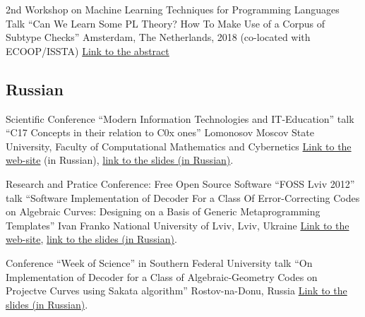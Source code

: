 \documentclass[11pt,a4paper]{moderncv}   %
\newcommand{\CPP}
{C\nolinebreak[4]\hspace{-.05em}\raisebox{.35ex}{\scriptsize\bfseries +\hspace{-.05em}+}}
\newcommand{\myhref}[2]{\textcolor{blue}{\href{#1}{#2}}}
\begin{document}
%
    {2nd Workshop on Machine Learning Techniques for Programming Languages}%
    {Talk ``Can We Learn Some PL Theory? How To Make Use of a Corpus of Subtype Checks''}
    {Amsterdam, The Netherlands, 2018 (co-located with ECOOP/ISSTA)}{}%
    {\myhref{%
https://conf.researchr.org/event/ecoop-issta-2018/ml4pl-2018-papers-can-we-learn-some-pl-theory-how-to-make-use-of-a-corpus-of-subtype-checks}{Link to the abstract}}

{\footnotesize
\subsection{Russian}

%
    {Scientific Conference “Modern Information Technologies and IT-Education”}%
    {talk “\protect\CPP{}17 Concepts in their relation to \protect\CPP{}0x ones”}
    {Lomonosov Moscov State University, Faculty of Computational Mathematics and Cybernetics}{}%
    {\myhref{http://conf.it-edu.ru/conference/2015/programm}{Link to the web-site} (in Russian),
\myhref{http://staff.mmcs.sfedu.ru/~ulysses/Papers/Talks/2015-SITITO-Cpp1z-concepts.pdf}{link to the slides (in Russian)}.}

%
    {Research and Pratice Conference: Free Open Source Software “FOSS Lviv 2012”}%
    {talk “Software Implementation of Decoder For a Class Of Error-Correcting Codes on Algebraic Curves: Designing on a Basis of Generic Metaprogramming Templates”}%
    {Ivan Franko National University of Lviv, Lviv, Ukraine}{}%
    {\myhref{http://conference.linux.lviv.ua/en/main}{Link to the web-site},
\myhref{http://mmcs.sfedu.ru/~ulysses/Papers/Talks/2012-FOSS-Lviv.pdf}{link to the slides (in Russian)}.}

%
    {Conference “Week of Science” in Southern Federal University}%
    {talk “On Implementation of Decoder for a Class of Algebraic-Geometry Codes on Projectve Curves using Sakata algorithm”}%
    {Rostov-na-Donu, Russia}{}%
    {\myhref{http://mmcs.sfedu.ru/~ulysses/Papers/Talks/2008-SFedU-SciWeek-slides.pdf}{Link to the slides (in Russian)}.}
}
\end{document}
